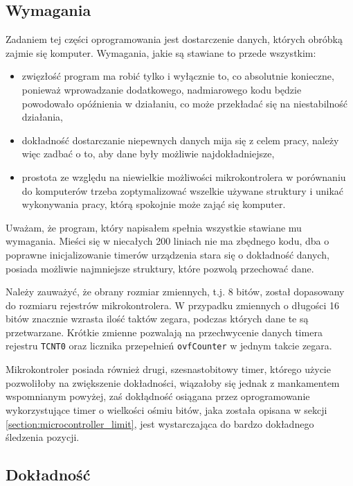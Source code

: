\subsection{Wymagania}
Zadaniem tej części oprogramowania jest dostarczenie danych, których obróbką zajmie się komputer. Wymagania, jakie są stawiane to przede wszystkim:
\begin{itemize}
 \item zwięzłość \ppauza program ma robić tylko i wyłącznie to, co absolutnie konieczne, ponieważ wprowadzanie dodatkowego, nadmiarowego kodu będzie powodowało opóźnienia w działaniu, co może przekładać się na
    niestabilność działania,
 \item dokładność \ppauza dostarczanie niepewnych danych mija się z celem pracy, należy więc zadbać o to, aby dane były możliwie najdokładniejsze,
 \item prostota \ppauza ze względu na niewielkie możliwości mikrokontrolera \ppauza w porównaniu do komputerów \ppauza trzeba zoptymalizować wszelkie używane struktury i unikać wykonywania pracy, którą spokojnie może zająć się komputer.
\end{itemize}

Uważam, że program, który napisałem spełnia wszystkie stawiane mu wymagania. Mieści się w niecałych 200 liniach \ppauza nie ma zbędnego kodu, dba o poprawne inicjalizowanie timerów urządzenia \ppauza stara się o dokładność danych, posiada możliwie najmniejsze struktury, które pozwolą przechować dane.

Należy zauważyć, że obrany rozmiar zmiennych, t.j. 8 bitów, został dopasowany do rozmiaru rejestrów mikrokontrolera. W przypadku zmiennych o długości 16 bitów znacznie wzrasta ilość taktów zegara, podczas których dane te są przetwarzane. Krótkie zmienne pozwalają na przechwycenie danych timera \ppauza rejestru \texttt{TCNT0} oraz licznika przepełnień \texttt{ovfCounter} \ppauza w jednym takcie zegara.

Mikrokontroler posiada również drugi, szesnastobitowy timer, którego użycie pozwoliłoby na zwiększenie dokładności, wiązałoby się jednak z mankamentem wspomnianym powyżej, zaś dokłądność osiągana przez oprogramowanie wykorzystujące timer o wielkości ośmiu bitów, jaka została opisana w sekcji \ref{section:microcontroller_limit}, jest wystarczająca do bardzo dokładnego śledzenia pozycji.

\subsection{Dokładność}\label{section:precision}
